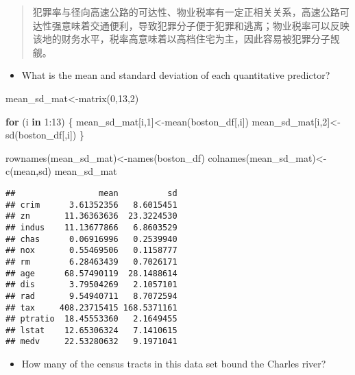 \documentclass[
]{article}
\newenvironment{Shaded}{\begin{snugshade}}{\end{snugshade}}
\newcommand{\ControlFlowTok}[1]{\textcolor[rgb]{0.13,0.29,0.53}{\textbf{#1}}}
\newcommand{\DecValTok}[1]{\textcolor[rgb]{0.00,0.00,0.81}{#1}}
\newcommand{\FunctionTok}[1]{\textcolor[rgb]{0.00,0.00,0.00}{#1}}
\newcommand{\NormalTok}[1]{#1}
\newcommand{\OtherTok}[1]{\textcolor[rgb]{0.56,0.35,0.01}{#1}}
\newcommand{\SpecialCharTok}[1]{\textcolor[rgb]{0.00,0.00,0.00}{#1}}
\newcommand{\StringTok}[1]{\textcolor[rgb]{0.31,0.60,0.02}{#1}}
\providecommand{\tightlist}{%
  \setlength{\itemsep}{0pt}\setlength{\parskip}{0pt}}
\begin{document}
\begin{quote}
犯罪率与径向高速公路的可达性、物业税率有一定正相关关系，高速公路可达性强意味着交通便利，导致犯罪分子便于犯罪和逃离；物业税率可以反映该地的财务水平，税率高意味着以高档住宅为主，因此容易被犯罪分子觊觎。
\end{quote}

\begin{itemize}
\tightlist
\item
  What is the mean and standard deviation of each quantitative
  predictor?
\end{itemize}

\begin{Shaded}
\begin{Highlighting}[]
\NormalTok{mean\_sd\_mat}\OtherTok{\textless{}{-}}\FunctionTok{matrix}\NormalTok{(}\DecValTok{0}\NormalTok{,}\DecValTok{13}\NormalTok{,}\DecValTok{2}\NormalTok{)}

\ControlFlowTok{for}\NormalTok{ (i }\ControlFlowTok{in} \DecValTok{1}\SpecialCharTok{:}\DecValTok{13}\NormalTok{) \{}
\NormalTok{  mean\_sd\_mat[i,}\DecValTok{1}\NormalTok{]}\OtherTok{\textless{}{-}}\FunctionTok{mean}\NormalTok{(boston\_df[,i])}
\NormalTok{  mean\_sd\_mat[i,}\DecValTok{2}\NormalTok{]}\OtherTok{\textless{}{-}}\FunctionTok{sd}\NormalTok{(boston\_df[,i])}
\NormalTok{\}}

\FunctionTok{rownames}\NormalTok{(mean\_sd\_mat)}\OtherTok{\textless{}{-}}\FunctionTok{names}\NormalTok{(boston\_df)}
\FunctionTok{colnames}\NormalTok{(mean\_sd\_mat)}\OtherTok{\textless{}{-}}\FunctionTok{c}\NormalTok{(}\StringTok{\textquotesingle{}mean\textquotesingle{}}\NormalTok{,}\StringTok{\textquotesingle{}sd\textquotesingle{}}\NormalTok{)}
\NormalTok{mean\_sd\_mat}
\end{Highlighting}
\end{Shaded}

\begin{verbatim}
##                 mean          sd
## crim      3.61352356   8.6015451
## zn       11.36363636  23.3224530
## indus    11.13677866   6.8603529
## chas      0.06916996   0.2539940
## nox       0.55469506   0.1158777
## rm        6.28463439   0.7026171
## age      68.57490119  28.1488614
## dis       3.79504269   2.1057101
## rad       9.54940711   8.7072594
## tax     408.23715415 168.5371161
## ptratio  18.45553360   2.1649455
## lstat    12.65306324   7.1410615
## medv     22.53280632   9.1971041
\end{verbatim}

\begin{itemize}
\tightlist
\item
  How many of the census tracts in this data set bound the Charles
  river?
\end{itemize}
\end{document}
